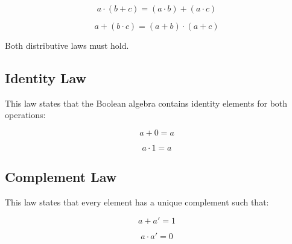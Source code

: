 \[
a \cdot (b + c) = (a \cdot b) + (a \cdot c)
\]

\[
a + (b \cdot c) = (a + b) \cdot (a + c)
\]

Both distributive laws must hold.

\subsection{ Identity Law}

This law states that the Boolean algebra contains identity elements for both operations:

\[
a + 0 = a
\]

\[
a \cdot 1 = a
\]

\subsection{ Complement Law}

This law states that every element has a unique complement such that:

\[
a + a' = 1
\]

\[
a \cdot a' = 0
\]
